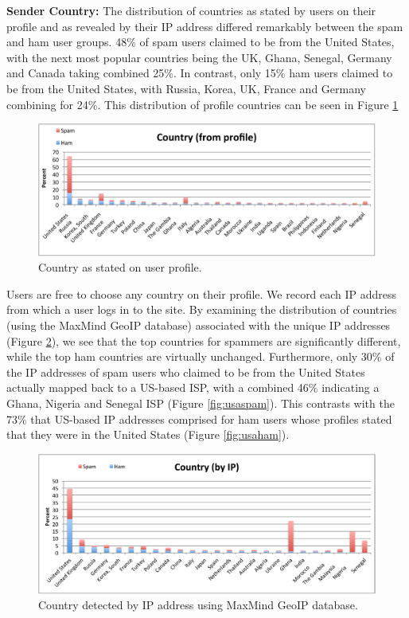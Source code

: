 \documentclass[preprint]{acm_proc_article-sp}
\begin{document}
\textbf{Sender Country:} The distribution of countries as stated by users on their profile and as 
revealed by their IP address differed remarkably between the spam and ham user groups. 
48\% of spam users claimed to be from the United States, with the next most popular 
countries being the UK, Ghana, Senegal, Germany and Canada taking combined 25\%. 
In contrast, only 15\% ham users claimed to be from the United States, with Russia, 
Korea, UK, France and Germany combining for 24\%. This distribution of profile countries can 
be seen in Figure \ref{fig:cprof}

\begin{figure}[h]
    \centering
    \includegraphics[width=\linewidth]{figures/country-prof.pdf}
    \caption{Country as stated on user profile.}
    \label{fig:cprof}
\end{figure}

Users are free to choose any country on their profile. We record each IP address from which a 
user logs in to the site. By examining the distribution of countries (using the MaxMind GeoIP 
database) associated with the unique IP addresses (Figure \ref{fig:cip}), we see that the top 
countries for spammers are significantly different, while the top ham countries are 
virtually unchanged. Furthermore, only 30\% of the IP addresses of spam users who 
claimed to be from the United States actually mapped back to a US-based ISP, with a combined 
46\% indicating a Ghana, Nigeria and Senegal ISP (Figure \ref{fig:usaspam}). This contrasts 
with the 73\% that US-based IP addresses comprised for ham users whose profiles stated that 
they were in the United States (Figure \ref{fig:usaham}).

\begin{figure}[h]
    \centering
    \includegraphics[width=\linewidth]{figures/country-ip.pdf}
    \caption{Country detected by IP address using MaxMind GeoIP database.}
    \label{fig:cip}
\end{figure}
\end{document}
